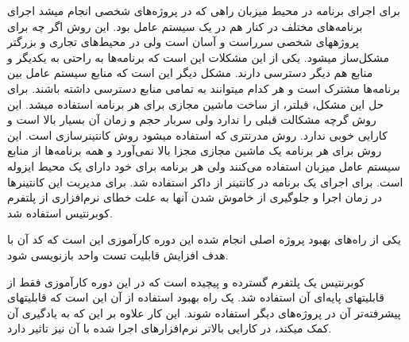 \documentclass[a4]{report}
\begin{document}
برای اجرای برنامه در محیط میزبان راهی که در پروژه‌های شخصی انجام میشد اجرای برنامه‌های مختلف در
کنار هم در یک سیستم عامل بود. این روش اگر چه برای پروژههای شخصی سرراست و آسان است ولی در
محیط‌های تجاری و بزرگتر مشکل‌ساز میشود. یکی از این مشکلات این است که برنامه‌ها به راحتی به یکدیگر و
منابع هم دیگر دسترسی دارند. مشکل دیگر این است که منابع سیستم عامل بین برنامه‌ها مشترک است و هر
کدام میتوانند به تمامی منابع دسترسی داشته باشند. برای حل این مشکل، قبلتر، از ساخت ماشین مجازی برای
هر برنامه استفاده میشد. این روش گرچه مشکالت قبلی را ندارد ولی سربار حجم و زمان آن بسیار بالا است و
کارایی خوبی ندارد. روش مدرنتری که استفاده میشود روش کانتینرسازی است. این روش برای هر برنامه یک
ماشین مجازی مجزا بالا نمی‌آورد و همه برنامه‌ها از منابع سیستم عامل میزبان استفاده می‌کنند ولی هر برنامه
برای خود دارای یک محیط ایزوله است. برای اجرای یک برنامه در کانتینر از داکر استفاده شد. برای مدیریت این
کانتینرها در زمان اجرا و جلوگیری از خاموش شدن آنها به علت خطای نرم‌افزاری از پلتفرم کوبرنتیس استفاده
شد.

یکی از راه‌های بهبود پروژه اصلی انجام شده این دوره کارآموزی این است که کد آن با هدف افزایش قابلیت
تست واحد بازنویسی شود.

کوبرنتیس یک پلتفرم گسترده و پیچیده است که در این دوره کارآموزی فقط از قابلیتهای پایه‌ای آن استفاده
شد. یک راه بهبود استفاده از آن این است که قابلیتهای پیشرفته‌تر آن در پروژه‌های دیگر استفاده شوند. این کار
علاوه بر این که به یادگیری آن کمک میکند، در کارایی بالاتر نرم‌افزارهای اجرا شده با آن نیز تاثیر دارد.



\end{document}
